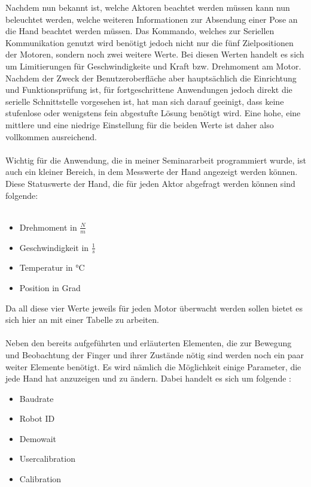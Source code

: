 \documentclass[11pt]{scrartcl}
\begin{document}
\begin{onehalfspace}
Nachdem nun bekannt ist, welche Aktoren beachtet werden müssen kann nun beleuchtet werden, welche weiteren Informationen zur Absendung einer Pose an die Hand beachtet werden müssen. Das Kommando, welches zur Seriellen Kommunikation genutzt wird benötigt jedoch nicht nur die fünf Zielpositionen der Motoren, sondern noch zwei weitere Werte. Bei diesen Werten handelt es sich um Limitierungen für Geschwindigkeite und Kraft bzw. Drehmoment am Motor. Nachdem der Zweck der Benutzeroberfläche aber hauptsächlich die Einrichtung und Funktionsprüfung ist, für fortgeschrittene Anwendungen jedoch direkt die serielle Schnittstelle vorgesehen ist, hat man sich darauf geeinigt, dass keine stufenlose oder wenigstens fein abgestufte Lösung benötigt wird. Eine hohe, eine mittlere und eine niedrige Einstellung für die beiden Werte ist daher also vollkommen ausreichend.\\\\

Wichtig für die Anwendung, die in meiner Seminararbeit programmiert wurde, ist auch ein kleiner Bereich, in dem Messwerte der Hand angezeigt werden können. Diese  Statuswerte der Hand, die für jeden Aktor abgefragt werden können sind folgende:
\\\\

\begin{itemize}
 \item Drehmoment in $\frac{N}{m}$
 \item Geschwindigkeit in $\frac{1}{s}$
 \item Temperatur in °C
 \item Position in Grad
\end{itemize}

Da all diese vier Werte jeweils für jeden Motor überwacht werden sollen bietet es sich hier an mit einer Tabelle zu arbeiten.\\\\

Neben den bereits aufgeführten und erläuterten Elementen, die zur Bewegung und Beobachtung der Finger und ihrer Zustände nötig sind werden noch ein paar weiter Elemente benötigt. Es wird nämlich die Möglichkeit einige Parameter, die jede Hand hat anzuzeigen und zu ändern. Dabei handelt es sich um folgende :


\begin{itemize}
 \item Baudrate
 \item Robot ID
 \item Demowait
 \item Usercalibration
 \item Calibration
\end{itemize}


\end{onehalfspace}
\end{document}
